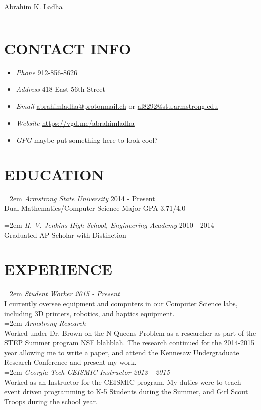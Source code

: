 \documentclass[11pt]{article} %
\begin{document}
{\huge Abrahim K. Ladha}\\
\hrule
\section*{CONTACT INFO}
\begin{itemize}
\item \emph{Phone} 912-856-8626
\item \emph{Address} 418 East 56th Street
\item \emph{Email}  \href{mailto:abrahimladha@protonmail.ch}{abrahimladha@protonmail.ch} or \href{mailto:al8292@stu.armstrong.edu}{al8292@stu.armstrong.edu}%
\item \emph{Website}  \url{https://vgd.me/abrahimladha} %
\item \emph{GPG}  maybe put something here to look cool?
\end{itemize}

\section*{EDUCATION}
\hangindent=2em
\emph{Armstrong State University} 2014 - Present\\
Dual Mathematics/Computer Science Major GPA 3.71/4.0

\hangindent=2em
\emph{H. V. Jenkins High School, Engineering Academy} 2010 - 2014\\
Graduated AP Scholar with Distinction


\section*{EXPERIENCE}
\hangindent=2em
\emph{Student Worker 2015 - Present}\\
I currently oversee equipment and computers in our Computer Science labs, including 3D printers, robotics, and haptics equipment. \\

\hangindent=2em
\emph{Armstrong Research}\\
Worked under Dr. Brown on the N-Queens Problem as a researcher as part of the STEP Summer program NSF blahblah. The research continued for the 2014-2015 year allowing me to write a paper, and attend the Kennesaw Undergraduate Research Conference and present my work. \\

\hangindent=2em
\emph{Georgia Tech CEISMIC Instructor 2013 - 2015}\\
Worked as an Instructor for the CEISMIC program. My duties were to teach event driven programming to K-5 Students during the Summer, and Girl Scout Troops during the school year.
\end{document}
